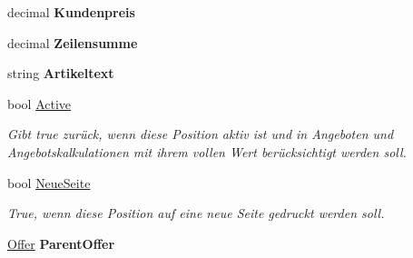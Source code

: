 \begin{DoxyCompactItemize}
\item 
decimal {\bfseries Kundenpreis}\hypertarget{class_products_1_1_model_1_1_entities_1_1_offer_detail_a8471c0659bf10f01d90d34f95aed5650}{}\label{class_products_1_1_model_1_1_entities_1_1_offer_detail_a8471c0659bf10f01d90d34f95aed5650}

\item 
decimal {\bfseries Zeilensumme}\hypertarget{class_products_1_1_model_1_1_entities_1_1_offer_detail_a90976821d6107736d8d67e4a19254c6b}{}\label{class_products_1_1_model_1_1_entities_1_1_offer_detail_a90976821d6107736d8d67e4a19254c6b}

\item 
string {\bfseries Artikeltext}\hypertarget{class_products_1_1_model_1_1_entities_1_1_offer_detail_a063c7e1a4afe68de229f76061067bb18}{}\label{class_products_1_1_model_1_1_entities_1_1_offer_detail_a063c7e1a4afe68de229f76061067bb18}

\item 
bool \hyperlink{class_products_1_1_model_1_1_entities_1_1_offer_detail_a2ee17ae10f0b89b83b5defa58b7eddec}{Active}
\begin{DoxyCompactList}\small\item\em Gibt true zurück, wenn diese Position aktiv ist und in Angeboten und Angebotskalkulationen mit ihrem vollen Wert berücksichtigt werden soll. \end{DoxyCompactList}\item 
bool \hyperlink{class_products_1_1_model_1_1_entities_1_1_offer_detail_ab48004c165a603137684ff3d7a4acf4c}{Neue\+Seite}
\begin{DoxyCompactList}\small\item\em True, wenn diese Position auf eine neue Seite gedruckt werden soll. \end{DoxyCompactList}\item 
\hyperlink{class_products_1_1_model_1_1_entities_1_1_offer}{Offer} {\bfseries Parent\+Offer}\hypertarget{class_products_1_1_model_1_1_entities_1_1_offer_detail_ad32f36cb49a166251834b15d75923640}{}\label{class_products_1_1_model_1_1_entities_1_1_offer_detail_ad32f36cb49a166251834b15d75923640}


\end{DoxyCompactItemize}
